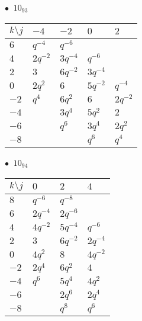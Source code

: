 \begin{minipage}{\linewidth}
$\bullet\ $ $10_{93}$ \vspace{0.5em} \\
\begin{tabular}{l|llll}
$k \setminus j$ & $-4$ & $-2$ & $0$ & $2$ \\
\hline
$6$ & $q^{-4}$ & $q^{-6}$ &  &  \\
$4$ & $2q^{-2}$ & $3q^{-4}$ & $q^{-6}$ &  \\
$2$ & $3$ & $6q^{-2}$ & $3q^{-4}$ &  \\
$0$ & $2q^{2}$ & $6$ & $5q^{-2}$ & $q^{-4}$ \\
$-2$ & $q^{4}$ & $6q^{2}$ & $6$ & $2q^{-2}$ \\
$-4$ &  & $3q^{4}$ & $5q^{2}$ & $2$ \\
$-6$ &  & $q^{6}$ & $3q^{4}$ & $2q^{2}$ \\
$-8$ &  &  & $q^{6}$ & $q^{4}$ \\
\end{tabular}
\vspace{2em}
\end{minipage}
%
\begin{minipage}{\linewidth}
$\bullet\ $ $10_{94}$ \vspace{0.5em} \\
\begin{tabular}{l|lll}
$k \setminus j$ & $0$ & $2$ & $4$ \\
\hline
$8$ & $q^{-6}$ & $q^{-8}$ &  \\
$6$ & $2q^{-4}$ & $2q^{-6}$ &  \\
$4$ & $4q^{-2}$ & $5q^{-4}$ & $q^{-6}$ \\
$2$ & $3$ & $6q^{-2}$ & $2q^{-4}$ \\
$0$ & $4q^{2}$ & $8$ & $4q^{-2}$ \\
$-2$ & $2q^{4}$ & $6q^{2}$ & $4$ \\
$-4$ & $q^{6}$ & $5q^{4}$ & $4q^{2}$ \\
$-6$ &  & $2q^{6}$ & $2q^{4}$ \\
$-8$ &  & $q^{8}$ & $q^{6}$ \\
\end{tabular}
\vspace{2em}
\end{minipage}
%
